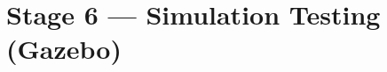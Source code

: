\documentclass[11pt, a4paper]{article}
\newcounter{exercise}[section]
\renewcommand{\theexercise}{\thesection.\arabic{exercise}}
\newenvironment{Ex}[1]
  {\refstepcounter{exercise}\begin{taskbox}{Exercise \theexercise\ --- #1}}
  {\end{taskbox}}
\begin{document}

\newpage
\section{Stage 6 — Simulation Testing (Gazebo)}
\end{document}
